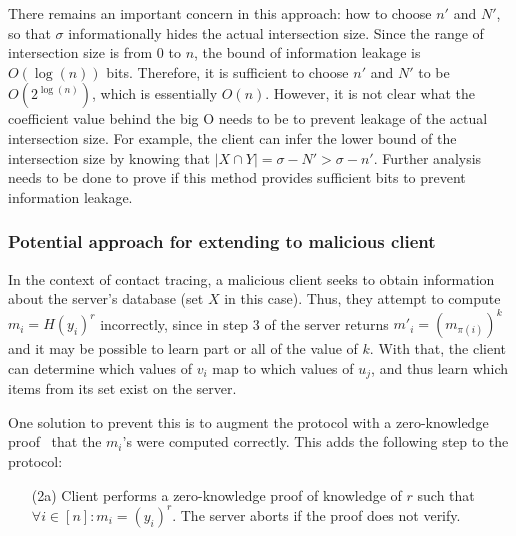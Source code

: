 {	
	There remains an important concern in this approach: how to choose $n'$ and $N'$, so that $\sigma$ informationally hides the actual intersection size. Since the range of intersection size is from $0$ to $n$, the bound of information leakage is $O(\log(n))$ bits. Therefore, it is sufficient to choose $n'$ and $N'$ to be  $O(2^{\log(n)})$, which is essentially $O(n)$. However, it is not clear what the coefficient value behind the big O needs to be to prevent leakage of the actual intersection size. For example, the client can infer the lower bound of the intersection size by knowing that  $|X \cap Y| = \sigma - N' > \sigma - n'$. Further analysis needs to be done to prove if this method provides sufficient bits to prevent information leakage. %
	
	
	\subsubsection{Potential approach for extending to malicious client}
	\label{subs:malicious_user}
	
	In the context of contact tracing, a malicious client seeks to obtain information about the server's database (set $X$ in this case). Thus, they attempt to compute $m_i = H(y_i)^r$ incorrectly, since in step 3 of  the server returns $m'_i=(m_{\pi(i)})^k$ and it may be possible to learn part or all of the value of $k$. With that, the client can determine which values of $v_i$ map to which values of $u_j$, and thus learn which items from its set exist on the server.
	
	One solution to prevent this is to augment the protocol with a zero-knowledge proof~\cite{SCN:JarLiu10,AC:DeCKimTsu10} that the $m_i$'s were computed correctly.
	This adds the following step to the protocol:
	\begin{itemize}
		\item[(2a)] Client performs a zero-knowledge proof of knowledge of $r$ such that $\forall i \in [n]: m_i = (y_i)^r$. The server aborts if the proof does not verify.
	\end{itemize}
	
}

